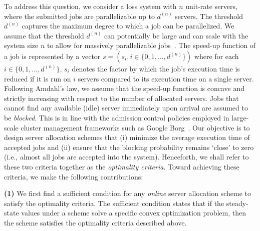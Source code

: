 \documentclass[a4paper]{article}
\theoremstyle{plain}
\theoremstyle{definition}
\theoremstyle{case}
\theoremstyle{remark}
\begin{document}
To address this question, we consider a loss system with $n$ unit-rate servers, where the submitted jobs are parallelizable up to $d^{(n)}$ servers. The threshold $d^{(n)}$ captures the maximum degree to which a job can be parallelized. 
We assume that the threshold $d^{(n)}$ can potentially be large and can scale with the system size $n$ to allow for massively parallelizable jobs~\cite{mpc1,mpc2}. The speed-up function of a job is represented by a vector $s=(s_i, i \in \{0,1,\ldots, d^{(n)}\})$ where for each $i\in \{0,1,\ldots, d^{(n)}\}$, $s_i$ denotes the factor by which the job's execution time is reduced if it is run on $i$ servers compared to its execution time on a single server. Following Amdahl's law, we assume that the speed-up function is concave and strictly increasing with respect to the number of allocated servers. 
Jobs that cannot find any available (idle) server immediately upon arrival are assumed to be \textit{blocked}. This is in line with the admission control policies employed in large-scale cluster management frameworks such as Google Borg~\cite{Google_Borg_2015}.
Our objective is to design server allocation schemes that (i) minimize the average execution time of accepted jobs and (ii) ensure that the blocking probability remains `close' to zero (i.e., almost all jobs are accepted into the system). Henceforth, we shall refer to these two criteria together as the {\em optimality criteria}. Toward achieving these criteria, we make the following contributions:



{\bf (1)} We first find a sufficient condition for any {\em online} server allocation scheme to satisfy the optimality criteria. 
The sufficient condition states that if the steady-state values under a scheme solve a specific convex optimization problem, then the scheme satisfies the optimality criteria described above. 
\end{document}

